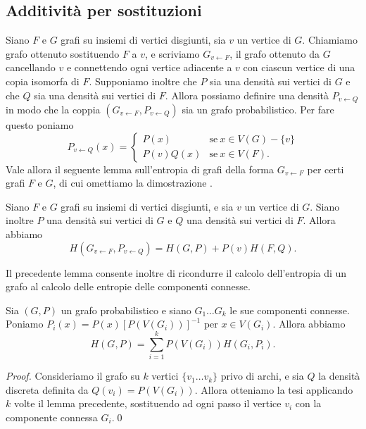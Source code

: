 \subsection{Additività per sostituzioni}
Siano \(F\) e \(G\) grafi su insiemi di vertici disgiunti, sia \(v\) un vertice di \(G\). Chiamiamo grafo ottenuto sostituendo \(F\) a \(v\), e scriviamo \(G_{v\leftarrow F}\), il grafo ottenuto da \(G\) cancellando \(v\) e connettendo ogni vertice adiacente a \(v\) con ciascun vertice di una copia isomorfa di \(F\). Supponiamo inoltre che \(P\) sia una densità sui vertici di \(G\) e che \(Q\) sia una densità sui vertici di \(F\). Allora possiamo definire una densità \(P_{v\leftarrow Q}\) in modo che la coppia \((G_{v\leftarrow F}, P_{v\leftarrow Q})\) sia un grafo probabilistico. Per fare questo poniamo
\[P_{v\leftarrow Q}(x)= 
\begin{cases}
	P(x) & \text{se}\ x\in V(G)-\{v\}\\
	P(v)Q(x) & \text{se}\ x\in V(F)\text{.}
\end{cases}
\]
Vale allora il seguente lemma sull'entropia di grafi della forma \(G_{v\leftarrow F}\) per certi grafi \(F\) e \(G\), di cui omettiamo la dimostrazione \cite{Korner1992}.
\begin{lemma}
	Siano \(F\) e \(G\) grafi su insiemi di vertici disgiunti, e sia \(v\) un vertice di \(G\). Siano inoltre \(P\) una densità sui vertici di \(G\) e \(Q\) una densità sui vertici di \(F\). Allora abbiamo
	\[H(G_{v\leftarrow F}, P_{v\leftarrow Q})=H(G,P)+P(v)H(F,Q).\]
\end{lemma}
Il precedente lemma consente inoltre di ricondurre il calcolo dell'entropia di un grafo al calcolo delle entropie delle componenti connesse.
\begin{corollary}
	Sia \((G,P)\) un grafo probabilistico e siano \(G_{1}\dots G_{k}\) le sue componenti connesse. Poniamo \(P_i(x)=P(x)[P(V(G_i))]^{-1}\) per \(x\in V(G_i)\). Allora abbiamo
	\[H(G,P)=\sum_{i=1}^k P(V(G_i))H(G_i,P_i).\]
\end{corollary}
\begin{proof}
	Consideriamo il grafo su \(k\) vertici \(\{v_{1}\dots v_{k}\}\) privo di archi, e sia \(Q\) la densità discreta definita da \(Q(v_{i}) = P(V(G_i))\). Allora otteniamo la tesi applicando \(k\) volte il lemma precedente, sostituendo ad ogni passo il vertice \(v_i\) con la componente connessa \(G_{i}\).\qed 
\end{proof}

